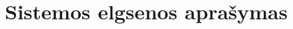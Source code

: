 \documentclass[a4paper,12pt]{article}
\begin{document}
\begin{frame}
\begin{tabular}{|l|l|}
\end{tabular}
\end{frame}

\section{Sistemos elgsenos aprašymas}
\end{document}
